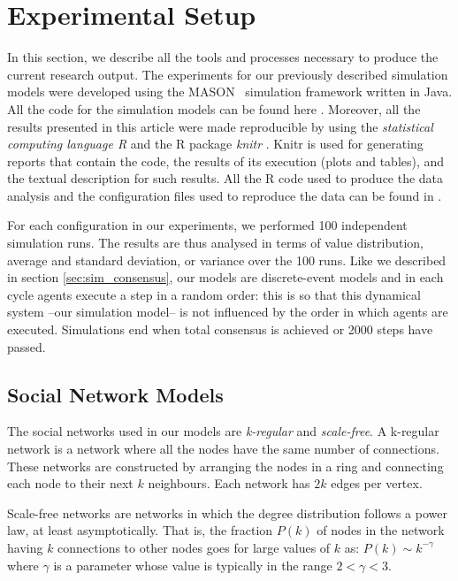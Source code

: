 \documentclass[preprint,number]{elsarticle}
\begin{document}
	\section{Experimental Setup}
	\label{sec:experimental-setup}
\noindent In this section, we describe all the tools and processes necessary to produce the current research output. The experiments for our previously described simulation models were developed using the MASON~\cite{Luke2005} simulation framework written in Java. All the code for the simulation models can be found here \cite{Nunes:Software:11067}. Moreover, all the results presented in this article were made reproducible by using the \textit{statistical computing language R} \cite{R2008} and the R package \textit{knitr} \cite{knitr2014}. Knitr is used for generating reports that contain the code, the results of its execution (plots and tables), and the textual description for such results. All the R code used  to produce the data analysis and the configuration files used to reproduce the data can be found in \cite{NunesAntunes2014:Analysis:11898}.

For each configuration in our experiments, we performed 100 independent simulation runs. The results are thus analysed in terms of value distribution, average and standard deviation, or variance over the 100 runs. Like we described in section \ref{sec:sim_consensus}, our models are discrete-event models and in each cycle agents execute 
a step in a random order: this is so that this dynamical system --our simulation model-- is not influenced by the order in which agents are executed. Simulations end when total consensus is achieved or 2000 steps have passed.  

\subsection{Social Network Models}
\label{sec:exp-setup_network_models}
\noindent The social networks used in our models are \textit{k-regular} and \textit{scale-free}. A k-regular network is a network where all the nodes have the same number of connections. These networks are constructed by arranging the nodes in a ring and connecting each node to their next $k$ neighbours. Each network has $2k$ edges per vertex. 

Scale-free networks are networks in which the degree distribution follows a power law, at least asymptotically. That is, the fraction $P(k)$ of nodes in the network having $k$ connections to other nodes goes for large values of $k$ as: $ P(k)  \sim  k^{-\gamma}$ where $\gamma$ is a parameter whose value is typically in the range $2 < \gamma < 3$.
\end{document}
